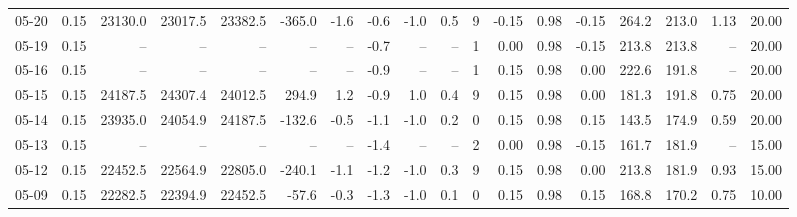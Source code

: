 \begin{threeparttable}
{\begin{tabular}{lrrrrrrrrrrrrrrrrr}
  05-20 &     0.15 & 23130.0 & 23017.5 & 23382.5 &     -365.0 &           -1.6 &                      -0.6 &                     -1.0 &                 0.5 &              9 &      -0.15 &      0.98 &          -0.15 &            264.2 &               213.0 &            1.13 &                  20.00 \\
  05-19 &     0.15 &      -- &      -- &      -- &         -- &             -- &                      -0.7 &                       -- &                  -- &              1 &       0.00 &      0.98 &          -0.15 &            213.8 &               213.8 &              -- &                  20.00 \\
  05-16 &     0.15 &      -- &      -- &      -- &         -- &             -- &                      -0.9 &                       -- &                  -- &              1 &       0.15 &      0.98 &           0.00 &            222.6 &               191.8 &              -- &                  20.00 \\
  05-15 &     0.15 & 24187.5 & 24307.4 & 24012.5 &      294.9 &            1.2 &                      -0.9 &                      1.0 &                 0.4 &              9 &       0.15 &      0.98 &           0.00 &            181.3 &               191.8 &            0.75 &                  20.00 \\
  05-14 &     0.15 & 23935.0 & 24054.9 & 24187.5 &     -132.6 &           -0.5 &                      -1.1 &                     -1.0 &                 0.2 &              0 &       0.15 &      0.98 &           0.15 &            143.5 &               174.9 &            0.59 &                  20.00 \\
  05-13 &     0.15 &      -- &      -- &      -- &         -- &             -- &                      -1.4 &                       -- &                  -- &              2 &       0.00 &      0.98 &          -0.15 &            161.7 &               181.9 &              -- &                  15.00 \\
  05-12 &     0.15 & 22452.5 & 22564.9 & 22805.0 &     -240.1 &           -1.1 &                      -1.2 &                     -1.0 &                 0.3 &              9 &       0.15 &      0.98 &           0.00 &            213.8 &               181.9 &            0.93 &                  15.00 \\
  05-09 &     0.15 & 22282.5 & 22394.9 & 22452.5 &      -57.6 &           -0.3 &                      -1.3 &                     -1.0 &                 0.1 &              0 &       0.15 &      0.98 &           0.15 &            168.8 &               170.2 &            0.75 &                  10.00 \\

\end{tabular}}
\end{threeparttable}
